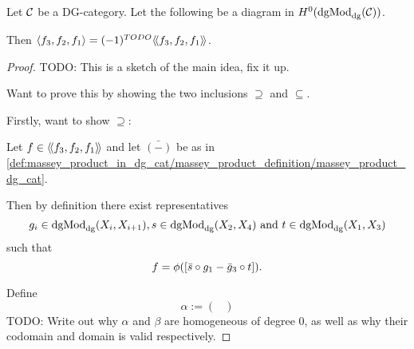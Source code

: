 \begin{theorem}
    Let \( {\mathcal{C}} \) be a DG-category. Let the following be a diagram in \( H^0(\operatorname{dgMod}_{\operatorname{dg}}({\mathcal{C}})) \).
    \begin{center}
    \end{center}
    Then \( \langle f_3, f_2, f_1\rangle = (-1)^{TODO} \langle \! \langle f_3, f_2, f_1\rangle \! \rangle \).
\end{theorem}
\begin{proof}
    TODO: This is a sketch of the main idea, fix it up.

    Want to prove this by showing the two inclusions \( \supseteq \) and \( \subseteq \).

    Firstly, want to show \( \supseteq \):

    Let \( f \in \langle \! \langle f_3, f_2, f_1\rangle \! \rangle \) and let \( \bar{(-)} \) be as in \autoref{def:massey_product_in_dg_cat/massey_product_definition/massey_product_dg_cat}.
    
    Then by definition there exist representatives
    \[
        g_i \in \operatorname{dgMod}_{\operatorname{dg}}(X_i, X_{i + 1}), s \in \operatorname{dgMod}_{\operatorname{dg}}(X_2, X_4) \text{ and } t \in \operatorname{dgMod}_{\operatorname{dg}}(X_1, X_3)
    \]
    such that
    \[
        f = \phi([\bar{s} \circ g_1 - \bar{g}_3 \circ t]).
    \]

    Define
    \[
        \alpha := 
        \begin{pmatrix}
            
        \end{pmatrix}
    \]
    TODO: Write out why \( \alpha \) and \( \beta \) are homogeneous of degree 0, as well as why their codomain and domain is valid respectively.

    

\end{proof}

